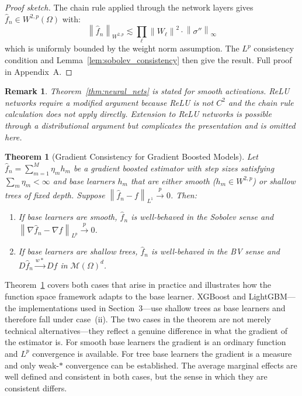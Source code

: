 \documentclass[12pt]{article}
\newtheorem{theorem}{Theorem}
\newtheorem{remark}{Remark}
\newcommand{\norm}[1]{\left\| #1 \right\|}
\newcommand{\Wtwop}{W^{2,p}(\Omega)}
\newcommand{\cM}{\mathcal{M}(\Omega)^d}
\newcommand{\fn}{\hat{f}_n}
\newcommand{\xrightarrowp}{\xrightarrow{p}}
\newcommand{\wstar}{\xrightarrow{w*}}
\begin{document}
	\begin{proof}[Proof sketch]
		The chain rule applied through the network layers gives $\fn \in \Wtwop$ with:
		\begin{equation}
			\norm{\fn}_{W^{2,p}} \lesssim \prod_\ell \norm{W_\ell}^2 \cdot
			\norm{\sigma''}_\infty
		\end{equation}
		which is uniformly bounded by the weight norm assumption. The $L^p$ consistency
		condition and Lemma~\ref{lem:sobolev_consistency} then give the result. Full proof
		in Appendix~A.
	\end{proof}
	
	\begin{remark}
		Theorem~\ref{thm:neural_nets} is stated for smooth activations. ReLU networks
		require a modified argument because ReLU is not $C^2$ and the chain rule calculation
		does not apply directly. Extension to ReLU networks is possible through a
		distributional argument but complicates the presentation and is omitted here.
	\end{remark}
	
	\begin{theorem}[Gradient Consistency for Gradient Boosted Models]
		\label{thm:boosting}
		Let $\fn = \sum_{m=1}^M \eta_m h_m$ be a gradient boosted estimator with step sizes
		satisfying $\sum_m \eta_m < \infty$ and base learners $h_m$ that are either smooth
		($h_m \in W^{2,p}$) or shallow trees of fixed depth. Suppose
		$\norm{\fn - f}_{L^1} \xrightarrowp 0$. Then:
		\begin{enumerate}
			\item[(i)] If base learners are smooth, $\fn$ is well-behaved in the Sobolev
			sense and $\norm{\nabla \fn - \nabla f}_{L^p} \xrightarrowp 0$.
			\item[(ii)] If base learners are shallow trees, $\fn$ is well-behaved in the
			BV sense and $D\fn \wstar Df$ in $\cM$.
		\end{enumerate}
	\end{theorem}
	
	Theorem~\ref{thm:boosting} covers both cases that arise in practice and illustrates how the function space framework adapts to the base learner. XGBoost and LightGBM---the implementations used in Section~3---use shallow trees as base learners and therefore fall under case~(ii). The two cases in the theorem are not merely technical alternatives---they reflect a genuine difference in what the gradient of the estimator is. For smooth base learners the gradient is an ordinary function and $L^p$ convergence is available. For tree base learners the gradient is a measure and only weak-$*$ convergence can be established. The average marginal effects are well defined and consistent in both cases, but the sense in which they are consistent differs.
	
\end{document}
